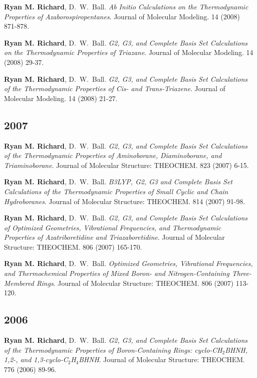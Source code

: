 \documentclass[11pt,a4paper,sans]{moderncv}
\begin{document}
\begin{etaremune}
	\item{\textbf{Ryan M. Richard}, D.~W.~Ball. {\em Ab Initio Calculations on the Thermodynamic Properties of Azaborospiropentanes}.  Journal of Molecular Modeling. 14 (2008) 871-878. }

	\item{\textbf{Ryan M. Richard}, D.~W.~Ball. {\em G2, G3, and Complete Basis Set Calculations on the Thermodynamic Properties of Triazane}.  Journal of Molecular Modeling.  14 (2008) 29-37.}

	\item{\textbf{Ryan M. Richard}, D.~W.~Ball. {\em G2, G3, and Complete Basis Set Calculations of the Thermodynamic Properties of Cis- and Trans-Triazene}.  Journal of Molecular Modeling.  14 (2008) 21-27.}
	\subsection{2007}
	\item{\textbf{Ryan M. Richard}, D.~W.~Ball. {\em G2, G3, and Complete Basis Set Calculations of the Thermodynamic Properties of Aminoborane, Diaminoborane, and Triaminoborane}.  Journal of Molecular Structure: THEOCHEM.  823 (2007) 6-15.}

	\item{\textbf{Ryan M. Richard}, D.~W.~Ball. {\em B3LYP, G2, G3 and Complete Basis Set Calculations of the Thermodynamic Properties of Small Cyclic and Chain Hydroboranes}.  Journal of Molecular Structure: THEOCHEM. 814 (2007) 91-98.}

	\item{\textbf{Ryan M. Richard}, D.~W.~Ball. {\em G2, G3, and Complete Basis Set Calculations of Optimized Geometries, Vibrational Frequencies, and Thermodynamic Properties of Azatriboretidine and Triazaboretidine}.  Journal of Molecular Structure: THEOCHEM.  806 (2007) 165-170.}

	\item{\textbf{Ryan M. Richard}, D.~W.~Ball.  {\em Optimized Geometries, Vibrational Frequencies, and Thermochemical Properties of Mixed Boron- and Nitrogen-Containing Three-Membered Rings}. Journal of Molecular Structure: THEOCHEM.  806 (2007) 113-120.}
	\subsection{2006}
	\item{\textbf{Ryan M. Richard}, D.~W.~Ball. {\em G2, G3, and Complete Basis Set Calculations of the Thermodynamic Properties of Boron-Containing Rings: cyclo-CH$_2$BHNH, 1,2-, and 1,3-cyclo-C$_2$H$_4$BHNH}. Journal of Molecular Structure: THEOCHEM.  776 (2006) 89-96. }
\end{etaremune}
\end{document}

